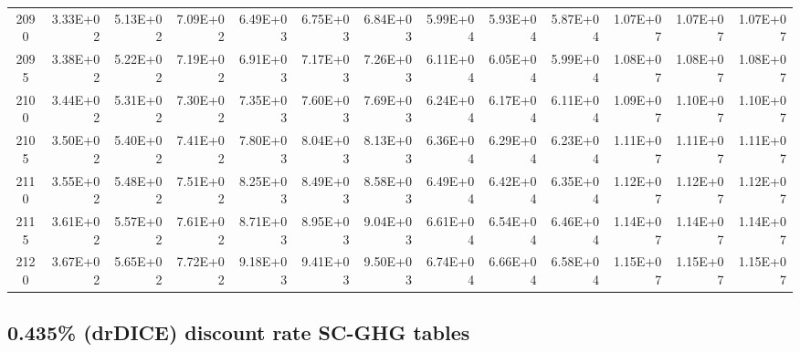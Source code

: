 \documentclass{article}
\begin{document}
\begin{table}
\begin{tabular}{crrr|rrr|rrr|rrr}
2090     & 3.33E+02 & 5.13E+02 & 7.09E+02 & 6.49E+03 & 6.75E+03 & 6.84E+03 & 5.99E+04 & 5.93E+04 & 5.87E+04 & 1.07E+07 & 1.07E+07 & 1.07E+07 \\
2095     & 3.38E+02 & 5.22E+02 & 7.19E+02 & 6.91E+03 & 7.17E+03 & 7.26E+03 & 6.11E+04 & 6.05E+04 & 5.99E+04 & 1.08E+07 & 1.08E+07 & 1.08E+07 \\
2100     & 3.44E+02 & 5.31E+02 & 7.30E+02 & 7.35E+03 & 7.60E+03 & 7.69E+03 & 6.24E+04 & 6.17E+04 & 6.11E+04 & 1.09E+07 & 1.10E+07 & 1.10E+07 \\
2105     & 3.50E+02 & 5.40E+02 & 7.41E+02 & 7.80E+03 & 8.04E+03 & 8.13E+03 & 6.36E+04 & 6.29E+04 & 6.23E+04 & 1.11E+07 & 1.11E+07 & 1.11E+07 \\
2110     & 3.55E+02 & 5.48E+02 & 7.51E+02 & 8.25E+03 & 8.49E+03 & 8.58E+03 & 6.49E+04 & 6.42E+04 & 6.35E+04 & 1.12E+07 & 1.12E+07 & 1.12E+07 \\
2115     & 3.61E+02 & 5.57E+02 & 7.61E+02 & 8.71E+03 & 8.95E+03 & 9.04E+03 & 6.61E+04 & 6.54E+04 & 6.46E+04 & 1.14E+07 & 1.14E+07 & 1.14E+07 \\
2120     & 3.67E+02 & 5.65E+02 & 7.72E+02 & 9.18E+03 & 9.41E+03 & 9.50E+03 & 6.74E+04 & 6.66E+04 & 6.58E+04 & 1.15E+07 & 1.15E+07 & 1.15E+07
\end{tabular}   \end{table}
\clearpage


\subsection{0.435\% (drDICE) discount rate SC-GHG tables}
\end{document}

